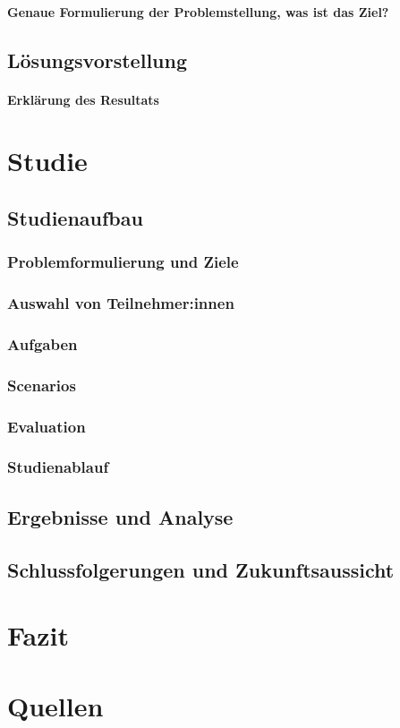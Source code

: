 \documentclass[a4paper, 12pt, oneside, BCOR=1cm,toc=chapterentrywithdots]{scrbook}
\begin{document}
\subsubsection{Genaue Formulierung der Problemstellung, was ist das Ziel?}
\section{Lösungsvorstellung}
\subsubsection{Erklärung des Resultats}

\chapter{Studie}
\section{Studienaufbau}
\subsection{Problemformulierung und Ziele}
\subsection{Auswahl von Teilnehmer:innen}
\subsection{Aufgaben}
\subsection{Scenarios}
\subsection{Evaluation}
\subsection{Studienablauf}
\section{Ergebnisse und Analyse}
\section{Schlussfolgerungen und Zukunftsaussicht}

\chapter{Fazit}


\nocite{*}
\chapter*{Quellen}
\begingroup
\let\clearpage\relax
\printbibliography[filter=articles, title=Artikel, heading=subbibliography]
\printbibliography[type=book, title=Bücher, heading=subbibliography]
\printbibliography[type=misc, title=sonstige, heading=subbibliography]
\endgroup

\printindex
\end{document}
